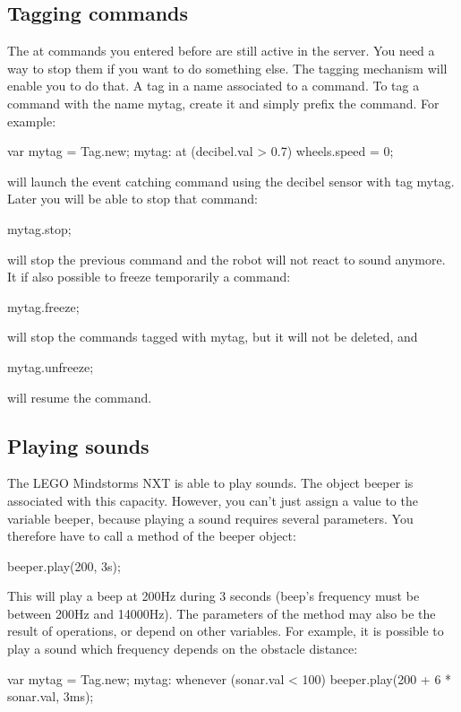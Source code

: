 \subsection{Tagging commands}
The at commands you entered before are still active in the server. You need a
way to stop them if you want to do something else. The tagging mechanism will
enable you to do that.
A tag in a name associated to a command. To tag a command with the name mytag,
create it and simply prefix the command. For example:
\begin{urbiunchecked}
  var mytag = Tag.new;
  mytag: at (decibel.val > 0.7)
    wheels.speed = 0;
\end{urbiunchecked}

will launch the event catching command using the decibel sensor with tag mytag.
Later you will be able to stop that command:
\begin{urbiunchecked}
  mytag.stop;
\end{urbiunchecked}

will stop the previous command and the robot will not react to sound anymore.
It if also possible to freeze temporarily a command:
\begin{urbiunchecked}
  mytag.freeze;
\end{urbiunchecked}

will stop the commands tagged with mytag, but it will not be deleted, and
\begin{urbiunchecked}
  mytag.unfreeze;
\end{urbiunchecked}

will resume the command.

\subsection{Playing sounds}
\label{sec:nxt:sounds}
The LEGO Mindstorms NXT is able to play sounds. The object beeper is associated
with this capacity. However, you can't just assign a value to the variable
beeper, because playing a sound requires several parameters. You therefore have
to call a method of the beeper object:
\begin{urbiunchecked}
  beeper.play(200, 3s);
\end{urbiunchecked}

This will play a beep at 200Hz during 3 seconds (beep's frequency must be
between 200Hz and 14000Hz).
The parameters of the method may also be the result of operations, or depend on
other variables. For example, it is possible to play a sound which frequency
depends on the obstacle distance:
\begin{urbiunchecked}
  var mytag = Tag.new;
  mytag: whenever (sonar.val < 100)
    beeper.play(200 + 6 * sonar.val, 3ms);
\end{urbiunchecked}

